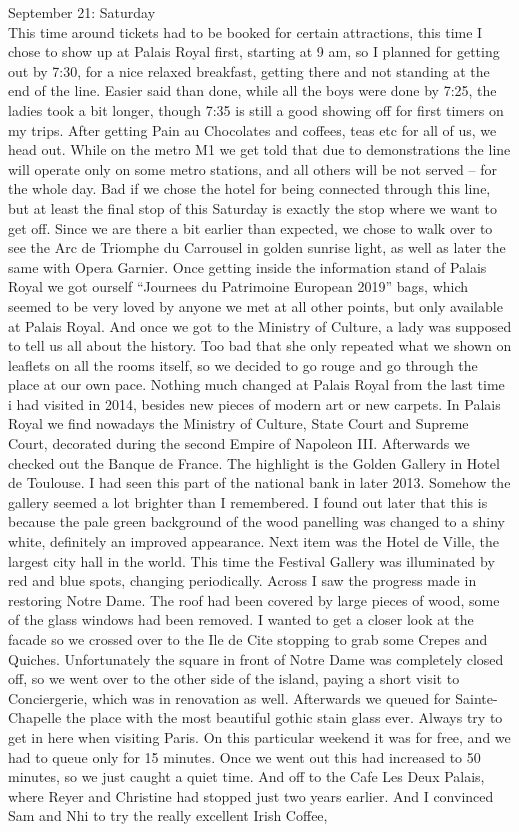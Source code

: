 September 21: Saturday\\
This time around tickets had to be booked for certain attractions, this time I chose to show up at Palais Royal first, starting at 9 am, so I planned for getting out by 7:30, for a nice relaxed breakfast, getting there and not standing at the end of the line. Easier said than done, while all the boys were done by 7:25, the ladies took a bit longer, though 7:35 is still a good showing off for first timers on my trips. After getting Pain au Chocolates and coffees, teas etc for all of us, we head out. While on the metro M1 we get told that due to demonstrations the line will operate only on some metro stations, and all others will be not served -- for the whole day. Bad if we chose the hotel for being connected through this line, but at least the final stop of this Saturday is exactly the stop where we want to get off. Since we are there a bit earlier than expected, we chose to walk over to see the Arc de Triomphe du Carrousel in golden sunrise light, as well as later the same with Opera Garnier. Once getting inside the information stand of Palais Royal we got ourself ``Journees du Patrimoine European 2019'' bags, which seemed to be very loved by anyone we met at all other points, but only available at Palais Royal. And once we got to the Ministry of Culture, a lady was supposed to tell us all about the history. Too bad that she only repeated what we shown on leaflets on all the rooms itself, so we decided to go rouge and go through the place at our own pace. Nothing much changed at Palais Royal from the last time i had visited in 2014, besides new pieces of modern art or new carpets. In Palais Royal we find nowadays the Ministry of Culture, State Court and Supreme Court, decorated during the second Empire of Napoleon III. Afterwards we checked out the Banque de France. The highlight is the Golden Gallery in Hotel de Toulouse. I had seen this part of the national bank in later 2013. Somehow the gallery seemed a lot brighter than I remembered. I found out later that this is because the pale green background of the wood panelling was changed to a shiny white, definitely an improved appearance. Next item was the Hotel de Ville, the largest city hall in the world. This time the Festival Gallery was illuminated by red and blue spots, changing periodically. Across I saw the progress made in restoring Notre Dame. The roof had been covered by large pieces of wood, some of the glass windows had been removed. I wanted to get a closer look at the facade so we crossed over to the Ile de Cite stopping to grab some Crepes and Quiches. Unfortunately the square in front of Notre Dame was completely closed off, so we went over to the other side of the island, paying a short visit to Conciergerie, which was in renovation as well. Afterwards we queued for Sainte-Chapelle the place with the most beautiful gothic stain glass ever. Always try to get in here when visiting Paris. On this particular weekend it was for free, and we had to queue only for 15 minutes. Once we went out this had increased to 50 minutes, so we just caught a quiet time. And off to the Cafe Les Deux Palais, where Reyer and Christine had stopped just two years earlier. And I convinced Sam and Nhi to try the really excellent Irish Coffee, 